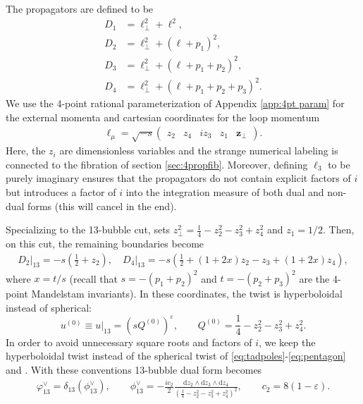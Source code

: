 \documentclass[11pt]{article}
\renewcommand{\d}{\text{d}}
\newcommand{\be}{\begin{equation}}
\newcommand{\ee}{\end{equation}}
\newcommand{\vphi}{\varphi}
\newcommand{\vep}{\varepsilon}
\newcommand{\bs}[1]{\boldsymbol{#1}}
\begin{document}
The propagators are defined to be
\begin{align} 
	\label{eq:D1}
	D_1 &= \ell_\perp^2 + \ell^2, 
	\\
	\label{eq:D2} 
	D_2 &= \ell_\perp^2 + (\ell + p_1)^2,
	\\
	\label{eq:D3}
	D_3 &= \ell_\perp^2 + (\ell + p_1 + p_2)^2,
	\\
	\label{eq:D4}
	D_4 &= \ell_\perp^2 + (\ell + p_1 + p_2 + p_3)^2.
\end{align}
We use the 4-point rational parameterization of Appendix \ref{app:4pt param} for the external momenta and cartesian coordinates for the loop momentum 
\begin{align} \label{eq:coords}
	\ell_\mu = \sqrt{-s} \begin{pmatrix} z_2 & z_4 & i z_3 & z_1 & \bs{z}_\perp  \end{pmatrix}.
\end{align}
Here, the $z_i$ are dimensionless variables and the strange numerical labeling is connected to the fibration of section \ref{sec:4propfib}. Moreover, defining $\ell_3$ to be purely imaginary ensures that the propagators do not contain explicit factors of $i$ but introduces a factor of $i$ into the integration measure of both dual and non-dual forms (this will cancel in the end).  

Specializing to the 13-bubble cut, sets $z_\perp^2 = \frac{1}{4} - z_2^2 - z_3^2 + z_4^2$ and $z_1 = 1/2$. Then, on this cut, the remaining boundaries become
\begin{align} \label{eq:13boundaries}
	D_2\vert_{13} = -s \left( \frac12 + z_2 \right),
	\quad
	D_4\vert_{13} = -s \left(\frac12 + (1+2x) z_2 -z_3 + (1+2x) z_4 \right),
\end{align}
where $x=t/s$ 
(recall that $s = -(p_1 +p_2)^2$ and $t=-(p_2+p_3)^2$ are the 4-point Mandelstam invariants). 
In these coordinates, the twist is hyperboloidal instead of spherical: 
\be \label{eq:u0}
	u^{(0)} \equiv u\vert_{13}= \left( s Q^{(0)} \right)^\vep,
	\qquad 
	Q^{(0)} = \frac{1}{4} - z_2^2 - z_3^2 + z_4^2 .
\ee
In order to avoid unnecessary square roots and factors of $i$, we keep the hyperboloidal twist instead of the spherical twist of \eqref{eq:tadpoles}-\eqref{eq:pentagon} and \cite{Caron-Huot:2021xqj}. With these conventions 13-bubble dual form becomes
\begin{align} \label{eq:bubdual}
	\vphi^\vee_{13} = \delta_{13} (\phi^\vee_{13}),
	\qquad
	\phi^\vee_{13} = -\frac{ic_2}{2} \frac{ \d z_2 \wedge \d z_3 \wedge \d z_4}{(\frac{1}{4} - z_2^2 - z_3^2 + z_4^2 )^2},
	\qquad 
	c_2 = 8 (1-\vep).
\end{align}
\end{document}

